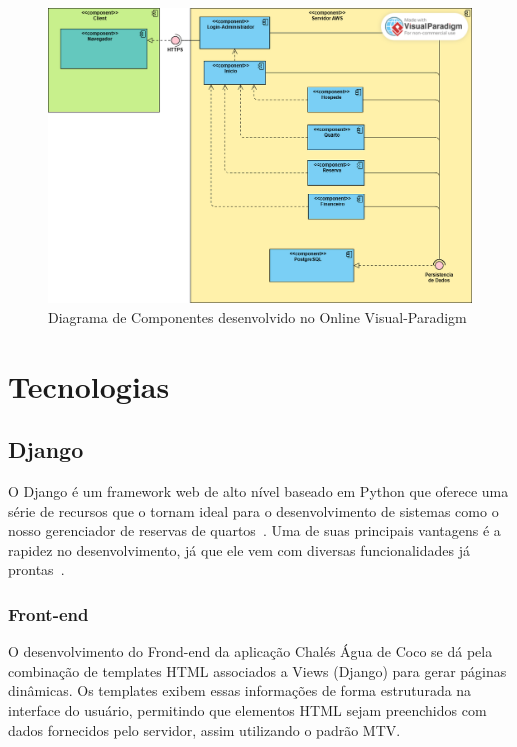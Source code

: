 \documentclass[
	12pt,				%
	openany,			%
	twoside,			%
	a4paper,			%
	english,			%
	french,				%
	spanish,			%
	brazil				%
	]{abntex2}
\begin{document}
\begin{figure}[h!]
	\centering
	\includegraphics[width=\textwidth]{0406-Componentes.png}
	\caption{Diagrama de Componentes desenvolvido no Online Visual-Paradigm}
	\label{fig:diagramacomponentes}
\end{figure}


\section{Tecnologias}

\subsection{Django}

O Django é um framework web de alto nível baseado em Python que oferece uma série de recursos que o tornam ideal para o desenvolvimento de sistemas como o nosso gerenciador de reservas de quartos~\cite{python}. Uma de suas principais vantagens é a rapidez no desenvolvimento, já que ele vem com diversas funcionalidades já prontas~\cite{django}.

\subsubsection{Front-end}

O desenvolvimento do Frond-end da aplicação Chalés Água de Coco se dá pela combinação de templates HTML associados a Views (Django) para gerar páginas dinâmicas. Os templates exibem essas informações de forma estruturada na interface do usuário, permitindo que elementos HTML sejam preenchidos com dados fornecidos pelo servidor, assim utilizando o padrão MTV.
\end{document}
